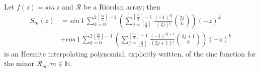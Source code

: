 
\begin{theorem}
\label{thm:sin-Hermite-interpolating-polys}
Let $f(z)=sin\,{z}$ and $\mathcal{R}$ be a Riordan array; then 
\begin{equation}
  \label{eq:sin-Hermite-interpolating-poly}
  \begin{split}
  S_{m}(z)  &= sin\,{1}\,\sum_{k=0}^{2\,\left\lceil \frac{m}{2} \right\rceil-2}{\left(\sum_{j=\left\lceil \frac{k}{2}\right\rceil}^{\left\lceil \frac{m}{2} \right\rceil -1}{\frac{(-1)^{3j}}{(2j)!}{2j\choose k}}\right) {(-z)^{k}}}\\
            &+ cos\,{1}\,\sum_{k=0}^{2\,\left\lfloor \frac{m}{2} \right\rfloor-1}{\left(\sum_{j=\left\lfloor \frac{k}{2}\right\rfloor}^{\left\lfloor \frac{m}{2} \right\rfloor -1}{\frac{(-1)^{3j+1}}{(2j + 1)!} {2j+1\choose k}}\right){(-z)^{k}}}
  \end{split}
\end{equation}
is an Hermite interpolating polynomial, explicitly written, of the sine
function for the minor $\mathcal{R}_{m}, m\in\mathbb{N}$.
\end{theorem}

